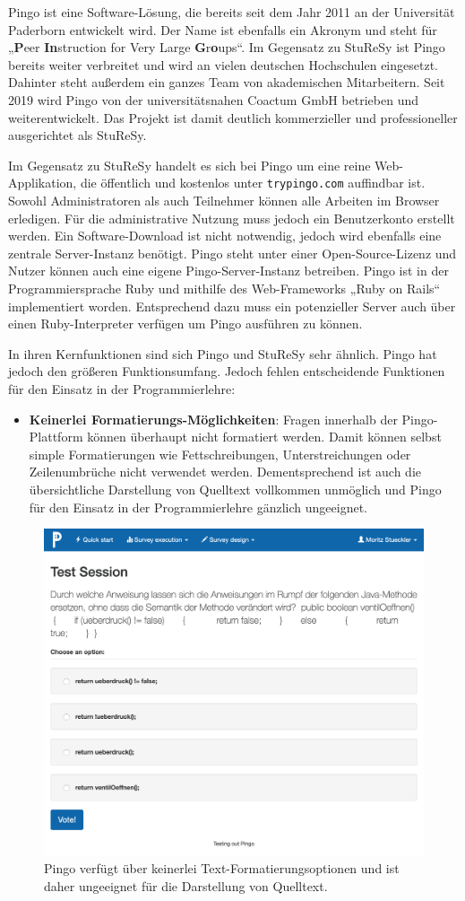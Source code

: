 Pingo ist eine Software-Lösung, die bereits seit dem Jahr 2011 an der Universität Paderborn entwickelt wird. Der Name ist ebenfalls ein Akronym und steht für „\textbf{P}eer \textbf{In}struction for Very Large \textbf{G}r\textbf{o}ups“. Im Gegensatz zu StuReSy ist Pingo bereits weiter verbreitet und wird an vielen deutschen Hochschulen eingesetzt. Dahinter steht außerdem ein ganzes Team von akademischen Mitarbeitern. Seit 2019 wird Pingo von der universitätsnahen Coactum GmbH betrieben und weiterentwickelt. Das Projekt ist damit deutlich kommerzieller und professioneller ausgerichtet als StuReSy.

Im Gegensatz zu StuReSy handelt es sich bei Pingo um eine reine Web-Applikation, die öffentlich und kostenlos unter \texttt{trypingo.com} auffindbar ist. Sowohl Administratoren als auch Teilnehmer können alle Arbeiten im Browser erledigen. Für die administrative Nutzung muss jedoch ein Benutzerkonto erstellt werden. Ein Software-Download ist nicht notwendig, jedoch wird ebenfalls eine zentrale Server-Instanz benötigt. Pingo steht unter einer Open-Source-Lizenz und Nutzer können auch eine eigene Pingo-Server-Instanz betreiben. Pingo ist in der Programmiersprache Ruby und mithilfe des Web-Frameworks „Ruby on Rails“ implementiert worden. Entsprechend dazu muss ein potenzieller Server auch über einen Ruby-Interpreter verfügen um Pingo ausführen zu können.

In ihren Kernfunktionen sind sich Pingo und StuReSy sehr ähnlich. Pingo hat jedoch den größeren Funktionsumfang. Jedoch fehlen entscheidende Funktionen für den Einsatz in der Programmierlehre:
\begin{itemize}
    \item \textbf{Keinerlei Formatierungs-Möglichkeiten}: Fragen innerhalb der Pingo-Plattform können überhaupt nicht formatiert werden. Damit können selbst simple Formatierungen wie Fettschreibungen, Unterstreichungen oder Zeilenumbrüche nicht verwendet werden. Dementsprechend ist auch die übersichtliche Darstellung von Quelltext vollkommen unmöglich und Pingo für den Einsatz in der Programmierlehre gänzlich ungeeignet.
\end{itemize}

\begin{figure}[H]
    \includegraphics[width=12cm]{chapter/bewertung/bilder/pingo_problem1.png}
    \centering
    \caption{Pingo verfügt über keinerlei Text-Formatierungsoptionen und ist daher ungeeignet für die Darstellung von Quelltext.}
    \label{Abbildung 2.5}
\end{figure}